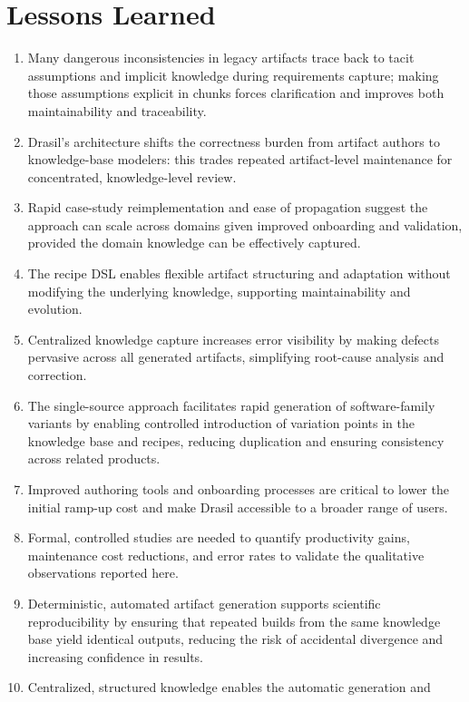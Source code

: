 \section{Lessons Learned}

\begin{enumerate}
\item Many dangerous inconsistencies in legacy artifacts trace back to tacit
  assumptions and implicit knowledge during requirements capture; making
  those assumptions explicit in chunks forces clarification and improves 
  both maintainability and traceability.
\item Drasil's architecture shifts the correctness burden from artifact authors 
  to knowledge-base modelers: this trades repeated artifact-level maintenance
  for concentrated, knowledge-level review.
\item Rapid case-study reimplementation and ease of propagation suggest the
  approach can scale across domains given improved onboarding and
  validation, provided the domain knowledge can be effectively captured.
\item The recipe DSL enables flexible artifact structuring and adaptation 
  without modifying the underlying knowledge, supporting maintainability and  
  evolution.
\item Centralized knowledge capture increases error visibility by making defects
  pervasive across all generated artifacts, simplifying root-cause analysis
  and correction.
\item The single-source approach facilitates rapid generation of software-family
  variants by enabling controlled introduction of variation points in the
  knowledge base and recipes, reducing duplication and ensuring consistency
  across related products.
\item Improved authoring tools and onboarding processes are critical to lower
  the initial ramp-up cost and make Drasil accessible to a broader range of
  users.
\item Formal, controlled studies are needed to quantify productivity gains,
  maintenance cost reductions, and error rates to validate the qualitative
  observations reported here.
\item Deterministic, automated artifact generation supports scientific 
  reproducibility by ensuring that repeated builds from the same knowledge base 
  yield identical outputs, reducing the risk of accidental divergence and 
  increasing confidence in results.
\item Centralized, structured knowledge enables the automatic generation and 

\end{enumerate}
